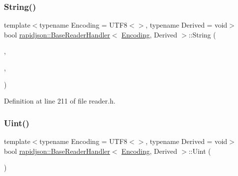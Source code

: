 \subsubsection{\texorpdfstring{String()}{String()}}
{\footnotesize\ttfamily template$<$typename Encoding = U\+T\+F8$<$$>$, typename Derived = void$>$ \\
bool \mbox{\hyperlink{structrapidjson_1_1_base_reader_handler}{rapidjson\+::\+Base\+Reader\+Handler}}$<$ \mbox{\hyperlink{classrapidjson_1_1_encoding}{Encoding}}, Derived $>$\+::String (\begin{DoxyParamCaption}\item[{const \mbox{\hyperlink{structrapidjson_1_1_base_reader_handler_a2932a8ecbb1997dda305f4dbef32ab0d}{Ch}} $\ast$}]{,  }\item[{\mbox{\hyperlink{namespacerapidjson_a44eb33eaa523e36d466b1ced64b85c84}{Size\+Type}}}]{,  }\item[{bool}]{ }\end{DoxyParamCaption})}



Definition at line 211 of file reader.\+h.


\begin{DoxyCode}{0}

\end{DoxyCode}
\mbox{\label{structrapidjson_1_1_base_reader_handler_a9627844582969a7d79a2250bdb4f9ec0}} 
\subsubsection{\texorpdfstring{Uint()}{Uint()}}
{\footnotesize\ttfamily template$<$typename Encoding = U\+T\+F8$<$$>$, typename Derived = void$>$ \\
bool \mbox{\hyperlink{structrapidjson_1_1_base_reader_handler}{rapidjson\+::\+Base\+Reader\+Handler}}$<$ \mbox{\hyperlink{classrapidjson_1_1_encoding}{Encoding}}, Derived $>$\+::Uint (\begin{DoxyParamCaption}\item[{unsigned}]{ }\end{DoxyParamCaption})}



